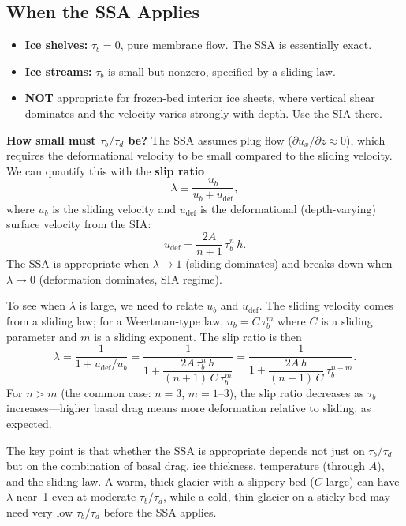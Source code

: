 \documentclass[11pt]{article}
\begin{document}
\subsection{When the SSA Applies}

\begin{itemize}[nosep]
  \item \textbf{Ice shelves:} $\tau_b = 0$, pure membrane flow.  The SSA is essentially exact.
  \item \textbf{Ice streams:} $\tau_b$ is small but nonzero, specified by a sliding law.
  \item \textbf{NOT} appropriate for frozen-bed interior ice sheets, where vertical shear dominates and the velocity varies strongly with depth.  Use the SIA there.
\end{itemize}

\noindent\textbf{How small must $\tau_b/\tau_d$ be?}  The SSA assumes plug flow ($\partial u_x/\partial z \approx 0$), which requires the deformational velocity to be small compared to the sliding velocity.  We can quantify this with the \textbf{slip ratio}
\begin{equation}
  \lambda \equiv \frac{u_b}{u_b + u_{\text{def}}},
\end{equation}
where $u_b$ is the sliding velocity and $u_{\text{def}}$ is the deformational (depth-varying) surface velocity from the SIA:
\begin{equation}
  u_{\text{def}} = \frac{2A}{n+1}\,\tau_b^n\,h.
\end{equation}
The SSA is appropriate when $\lambda \to 1$ (sliding dominates) and breaks down when $\lambda \to 0$ (deformation dominates, SIA regime).

\medskip
\noindent To see when $\lambda$ is large, we need to relate $u_b$ and $u_{\text{def}}$.  The sliding velocity comes from a sliding law; for a Weertman-type law, $u_b = C\,\tau_b^m$ where $C$ is a sliding parameter and $m$ is a sliding exponent.  The slip ratio is then
\begin{equation}
  \lambda = \frac{1}{1 + u_{\text{def}}/u_b} = \frac{1}{1 + \dfrac{2A\,\tau_b^n\,h}{(n+1)\,C\,\tau_b^m}} = \frac{1}{1 + \dfrac{2A\,h}{(n+1)\,C}\,\tau_b^{n-m}}.
\end{equation}
For $n > m$ (the common case: $n = 3$, $m = 1$--$3$), the slip ratio decreases as $\tau_b$ increases---higher basal drag means more deformation relative to sliding, as expected.

\medskip
\noindent The key point is that whether the SSA is appropriate depends not just on $\tau_b/\tau_d$ but on the combination of basal drag, ice thickness, temperature (through $A$), and the sliding law.  A warm, thick glacier with a slippery bed ($C$ large) can have $\lambda$ near~1 even at moderate $\tau_b/\tau_d$, while a cold, thin glacier on a sticky bed may need very low $\tau_b/\tau_d$ before the SSA applies.
\end{document}
